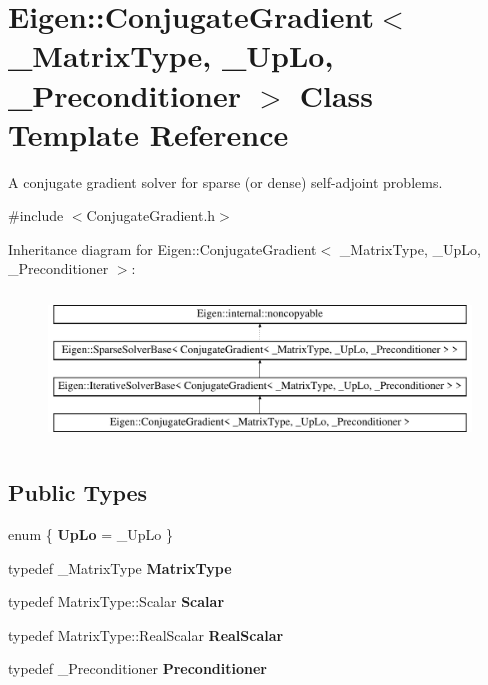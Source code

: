\hypertarget{class_eigen_1_1_conjugate_gradient}{}\section{Eigen\+::Conjugate\+Gradient$<$ \+\_\+\+Matrix\+Type, \+\_\+\+Up\+Lo, \+\_\+\+Preconditioner $>$ Class Template Reference}
\label{class_eigen_1_1_conjugate_gradient}


A conjugate gradient solver for sparse (or dense) self-\/adjoint problems.  




{\ttfamily \#include $<$Conjugate\+Gradient.\+h$>$}

Inheritance diagram for Eigen\+::Conjugate\+Gradient$<$ \+\_\+\+Matrix\+Type, \+\_\+\+Up\+Lo, \+\_\+\+Preconditioner $>$\+:\begin{figure}[H]
\begin{center}
\leavevmode
\includegraphics[height=4.000000cm]{class_eigen_1_1_conjugate_gradient}
\end{center}
\end{figure}
\subsection*{Public Types}
\begin{DoxyCompactItemize}
\item 
\mbox{\label{class_eigen_1_1_conjugate_gradient_af5e56de137a7c5b37a168a97d69df528}} 
enum \{ {\bfseries Up\+Lo} = \+\_\+\+Up\+Lo
 \}
\item 
\mbox{\label{class_eigen_1_1_conjugate_gradient_ac7e663c3436a92b0c2f45b288fbc1bb9}} 
typedef \+\_\+\+Matrix\+Type {\bfseries Matrix\+Type}
\item 
\mbox{\label{class_eigen_1_1_conjugate_gradient_a8c5a83c590bec382e23713092bfeec3f}} 
typedef Matrix\+Type\+::\+Scalar {\bfseries Scalar}
\item 
\mbox{\label{class_eigen_1_1_conjugate_gradient_aa29f85be5f03e532742c148d00cd56b8}} 
typedef Matrix\+Type\+::\+Real\+Scalar {\bfseries Real\+Scalar}
\item 
\mbox{\label{class_eigen_1_1_conjugate_gradient_a3d4ee165efe6de3647f9a1bc8074b8f0}} 
typedef \+\_\+\+Preconditioner {\bfseries Preconditioner}
\end{DoxyCompactItemize}

